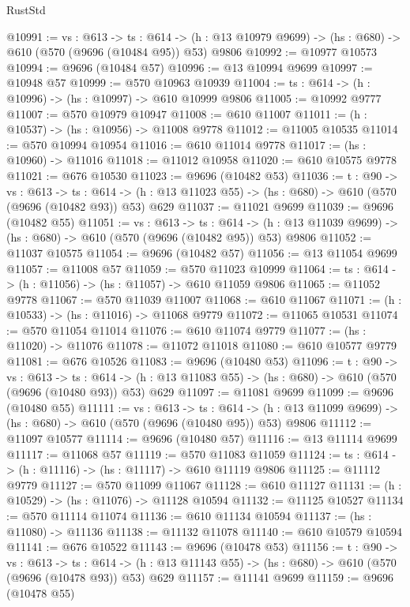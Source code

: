\begin{lexlean}{RustStd}
\begin{coremodule}
@10991 := {vs : @613} ->
  {ts : @614} -> (h : @13 @10979 @9699) -> (hs : @680) -> @610 (@570 (@9696 (@10484 @95)) @53) @9806
@10992 := @10977 @10573
@10994 := @9696 (@10484 @57)
@10996 := @13 @10994 @9699
@10997 := @10948 @57
@10999 := @570 @10963 @10939
@11004 := {ts : @614} -> (h : @10996) -> (hs : @10997) -> @610 @10999 @9806
@11005 := @10992 @9777
@11007 := @570 @10979 @10947
@11008 := @610 @11007
@11011 := (h : @10537) -> (hs : @10956) -> @11008 @9778
@11012 := @11005 @10535
@11014 := @570 @10994 @10954
@11016 := @610 @11014 @9778
@11017 := (hs : @10960) -> @11016
@11018 := @11012 @10958
@11020 := @610 @10575 @9778
@11021 := @676 @10530
@11023 := @9696 (@10482 @53)
@11036 := {t : @90} ->
  {vs : @613} ->
  {ts : @614} -> (h : @13 @11023 @55) -> (hs : @680) -> @610 (@570 (@9696 (@10482 @93)) @53) @629
@11037 := @11021 @9699
@11039 := @9696 (@10482 @55)
@11051 := {vs : @613} ->
  {ts : @614} -> (h : @13 @11039 @9699) -> (hs : @680) -> @610 (@570 (@9696 (@10482 @95)) @53) @9806
@11052 := @11037 @10575
@11054 := @9696 (@10482 @57)
@11056 := @13 @11054 @9699
@11057 := @11008 @57
@11059 := @570 @11023 @10999
@11064 := {ts : @614} -> (h : @11056) -> (hs : @11057) -> @610 @11059 @9806
@11065 := @11052 @9778
@11067 := @570 @11039 @11007
@11068 := @610 @11067
@11071 := (h : @10533) -> (hs : @11016) -> @11068 @9779
@11072 := @11065 @10531
@11074 := @570 @11054 @11014
@11076 := @610 @11074 @9779
@11077 := (hs : @11020) -> @11076
@11078 := @11072 @11018
@11080 := @610 @10577 @9779
@11081 := @676 @10526
@11083 := @9696 (@10480 @53)
@11096 := {t : @90} ->
  {vs : @613} ->
  {ts : @614} -> (h : @13 @11083 @55) -> (hs : @680) -> @610 (@570 (@9696 (@10480 @93)) @53) @629
@11097 := @11081 @9699
@11099 := @9696 (@10480 @55)
@11111 := {vs : @613} ->
  {ts : @614} -> (h : @13 @11099 @9699) -> (hs : @680) -> @610 (@570 (@9696 (@10480 @95)) @53) @9806
@11112 := @11097 @10577
@11114 := @9696 (@10480 @57)
@11116 := @13 @11114 @9699
@11117 := @11068 @57
@11119 := @570 @11083 @11059
@11124 := {ts : @614} -> (h : @11116) -> (hs : @11117) -> @610 @11119 @9806
@11125 := @11112 @9779
@11127 := @570 @11099 @11067
@11128 := @610 @11127
@11131 := (h : @10529) -> (hs : @11076) -> @11128 @10594
@11132 := @11125 @10527
@11134 := @570 @11114 @11074
@11136 := @610 @11134 @10594
@11137 := (hs : @11080) -> @11136
@11138 := @11132 @11078
@11140 := @610 @10579 @10594
@11141 := @676 @10522
@11143 := @9696 (@10478 @53)
@11156 := {t : @90} ->
  {vs : @613} ->
  {ts : @614} -> (h : @13 @11143 @55) -> (hs : @680) -> @610 (@570 (@9696 (@10478 @93)) @53) @629
@11157 := @11141 @9699
@11159 := @9696 (@10478 @55)

\end{coremodule}
\end{lexlean}
